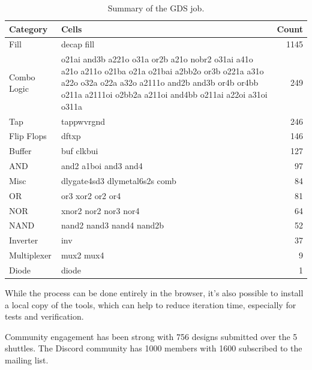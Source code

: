 \begin{table}[htbp]
\centering
\caption{Summary of the GDS job.}
\label{tab:gds_summary}
\begin{tabularx}{\textwidth}{@{}lXr@{}}
\toprule
\textbf{Category} & \textbf{Cells} & \textbf{Count} \\
\midrule
Fill & decap fill & 1145 \\
Combo Logic & o21ai and3b a221o o31a or2b a21o nobr2 o31ai a41o a21o a211o o21ba o21a o21bai a2bb2o or3b o221a a31o a22o o32a o22a a32o a2111o and2b and3b or4b or4bb o211a a2111oi o2bb2a a211oi and4bb o211ai a22oi a31oi o311a & 249 \\
Tap & tappwvrgnd & 246 \\
Flip Flops & dftxp & 146 \\
Buffer & buf clkbui & 127 \\
AND & and2 a1boi and3 and4 & 97 \\
Misc & dlygate4sd3 dlymetal6s2s comb & 84 \\
OR & or3 xor2 or2 or4 & 81 \\
NOR & xnor2 nor2 nor3 nor4 & 64 \\
NAND & nand2 nand3 nand4 nand2b & 52 \\
Inverter & inv & 37 \\
Multiplexer & mux2 mux4 & 9 \\
Diode & diode & 1 \\
\bottomrule
\end{tabularx}
\end{table}

While the process can be done entirely in the browser, it’s also possible to install a local copy of the tools, which can help to reduce iteration time, especially for tests and verification.

Community engagement has been strong with 756 designs submitted over the 5 shuttles.
The Discord community has 1000 members with 1600 subscribed to the mailing list.
